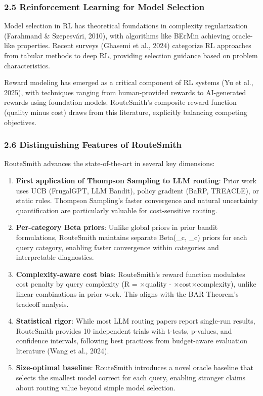 \documentclass[
  11pt,
]{article}
\begin{document}
\hypertarget{reinforcement-learning-for-model-selection}{%
\subsubsection{2.5 Reinforcement Learning for Model
Selection}\label{reinforcement-learning-for-model-selection}}

Model selection in RL has theoretical foundations in complexity
regularization (Farahmand \& Szepesvári, 2010), with algorithms like
BErMin achieving oracle-like properties. Recent surveys (Ghasemi et al.,
2024) categorize RL approaches from tabular methods to deep RL,
providing selection guidance based on problem characteristics.

Reward modeling has emerged as a critical component of RL systems (Yu et
al., 2025), with techniques ranging from human-provided rewards to
AI-generated rewards using foundation models. RouteSmith's composite
reward function (quality minus cost) draws from this literature,
explicitly balancing competing objectives.

\hypertarget{distinguishing-features-of-routesmith}{%
\subsubsection{2.6 Distinguishing Features of
RouteSmith}\label{distinguishing-features-of-routesmith}}

RouteSmith advances the state-of-the-art in several key dimensions:

\begin{enumerate}
\def\labelenumi{\arabic{enumi}.}
\item
  \textbf{First application of Thompson Sampling to LLM routing}: Prior
  work uses UCB (FrugalGPT, LLM Bandit), policy gradient (BaRP,
  TREACLE), or static rules. Thompson Sampling's faster convergence and
  natural uncertainty quantification are particularly valuable for
  cost-sensitive routing.
\item
  \textbf{Per-category Beta priors}: Unlike global priors in prior
  bandit formulations, RouteSmith maintains separate Beta(\alpha\_c,
  \beta\_c) priors for each query category, enabling faster convergence
  within categories and interpretable diagnostics.
\item
  \textbf{Complexity-aware cost bias}: RouteSmith's reward function
  modulates cost penalty by query complexity (R = \alpha×quality -
  \beta×cost×complexity), unlike linear combinations in prior work. This
  aligns with the BAR Theorem's tradeoff analysis.
\item
  \textbf{Statistical rigor}: While most LLM routing papers report
  single-run results, RouteSmith provides 10 independent trials with
  t-tests, p-values, and confidence intervals, following best practices
  from budget-aware evaluation literature (Wang et al., 2024).
\item
  \textbf{Size-optimal baseline}: RouteSmith introduces a novel oracle
  baseline that selects the smallest model correct for each query,
  enabling stronger claims about routing value beyond simple model
  selection.
\end{enumerate}
\end{document}
